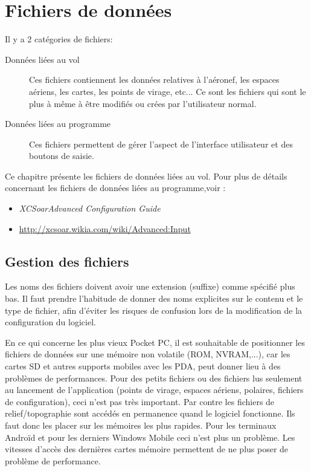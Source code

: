 \chapter{Fichiers de données}\label{cha:data-files}

Il y a 2 catégories de fichiers:
\begin{description}
\item[Données liées au vol]  Ces fichiers contiennent les données relatives à l'aéronef, les espaces aériens, les cartes, les points de virage, etc... Ce sont les fichiers qui sont le plus à même à être modifiés ou crées par l'utilisateur normal.
\item[Données liées au programme]  Ces fichiers permettent de gérer l'aspect de l'interface utilisateur et des boutons de saisie.
\end{description}
Ce chapitre présente les fichiers de données liées au vol. Pour plus de détails concernant les fichiers de données liées au  programme,voir :
\begin{itemize}
\item {\em XCSoarAdvanced Configuration Guide}
\item {\href{http://xcsoar.wikia.com/wiki/Advanced:Input}{http://xcsoar.wikia.com/wiki/Advanced:Input}}
\end{itemize}


\section{Gestion des fichiers}

Les noms des fichiers doivent avoir une extension (suffixe) comme spécifié plus bas. Il faut prendre l'habitude de donner des noms explicites sur le contenu et le type de fichier, afin d'éviter les risques de confusion lors de la modification de la configuration du logiciel.

En ce qui concerne les plus vieux Pocket PC, il est souhaitable de positionner les fichiers de données sur une mémoire non volatile (ROM, NVRAM,...), car les cartes SD et autres supports mobiles avec les PDA, peut donner lieu à des problèmes de performances. Pour des petits fichiers ou des fichiers lus seulement au lancement de l'application (points de virage, espaces aériens, polaires, fichiers de configuration), ceci n'est pas très important. Par contre les fichiers de relief/topographie sont accédés en permanence quand le logiciel fonctionne. Ils faut donc les placer sur les mémoires les plus rapides. Pour les terminaux Androïd et pour les derniers Windows Mobile ceci n'est plus un problème. Les vitesses d'accès des dernières cartes mémoire permettent de ne plus poser de problème de performance. 

